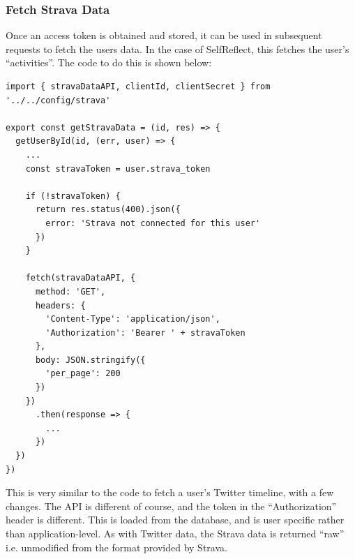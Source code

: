 \documentclass[11pt,openright,a4paper]{report}
\begin{document}
\subsubsection{Fetch Strava Data}
Once an access token is obtained and stored, it can be used in subsequent requests to fetch the users data. In the case of SelfReflect, this fetches the user's \enquote{activities}. The code to do this is shown below:
\begin{lstlisting}
import { stravaDataAPI, clientId, clientSecret } from '../../config/strava'

export const getStravaData = (id, res) => {
  getUserById(id, (err, user) => {
    ...
    const stravaToken = user.strava_token

    if (!stravaToken) {
      return res.status(400).json({
        error: 'Strava not connected for this user'
      })
    }

    fetch(stravaDataAPI, {
      method: 'GET',
      headers: {
        'Content-Type': 'application/json',
        'Authorization': 'Bearer ' + stravaToken
      },
      body: JSON.stringify({
        'per_page': 200
      })
    })
      .then(response => {
        ...
      })
  })
})
\end{lstlisting}

This is very similar to the code to fetch a user's Twitter timeline, with a few changes. The API is different of course, and the token in the \enquote{Authorization} header is different. This is loaded from the database, and is user specific rather than application-level. As with Twitter data, the Strava data is returned \enquote{raw} i.e. unmodified from the format provided by Strava.
\end{document}
